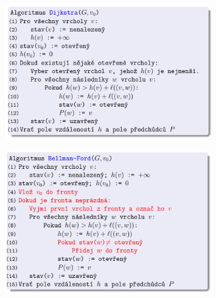 \documentclass{szzclass}
\begin{document}
\begin{figure}[h!]
\includegraphics[width=0.8\textwidth]{topics/bi-spol-4/images/dijkstra.png}
\end{figure}


\begin{figure}[h!]
\includegraphics[width=0.8\textwidth]{topics/bi-spol-4/images/bellman-ford.png}
\end{figure}
\end{document}
